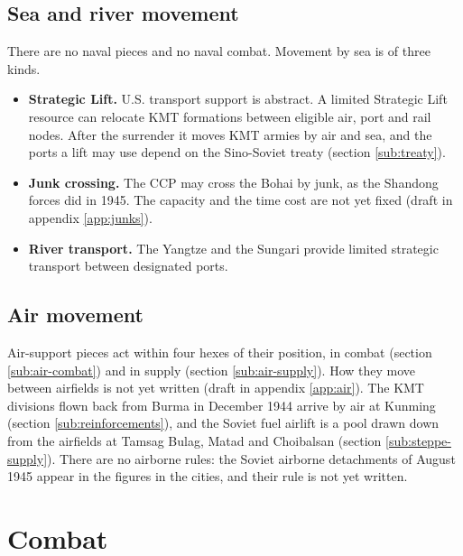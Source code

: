 \documentclass[11pt]{article}
\begin{document}
\subsection{Sea and river movement}\label{sub:sea-move}
There are no naval pieces and no naval combat. Movement by sea is of three kinds.
\begin{itemize}
\item \textbf{Strategic Lift.} U.S. transport support is abstract. A limited Strategic Lift resource can relocate KMT formations between eligible air, port and rail nodes. After the surrender it moves KMT armies by air and sea, and the ports a lift may use depend on the Sino-Soviet treaty (section \ref{sub:treaty}).
\item \textbf{Junk crossing.} The CCP may cross the Bohai by junk, as the Shandong forces did in 1945. The capacity and the time cost are not yet fixed (draft in appendix \ref{app:junks}).
\item \textbf{River transport.} The Yangtze and the Sungari provide limited strategic transport between designated ports.
\end{itemize}

\subsection{Air movement}\label{sub:air-move}
Air-support pieces act within four hexes of their position, in combat (section \ref{sub:air-combat}) and in supply (section \ref{sub:air-supply}). How they move between airfields is not yet written (draft in appendix \ref{app:air}). The KMT divisions flown back from Burma in December 1944 arrive by air at Kunming (section \ref{sub:reinforcements}), and the Soviet fuel airlift is a pool drawn down from the airfields at Tamsag Bulag, Matad and Choibalsan (section \ref{sub:steppe-supply}). There are no airborne rules: the Soviet airborne detachments of August 1945 appear in the figures in the cities, and their rule is not yet written.

\section{Combat}\label{sec:combat}
\end{document}
